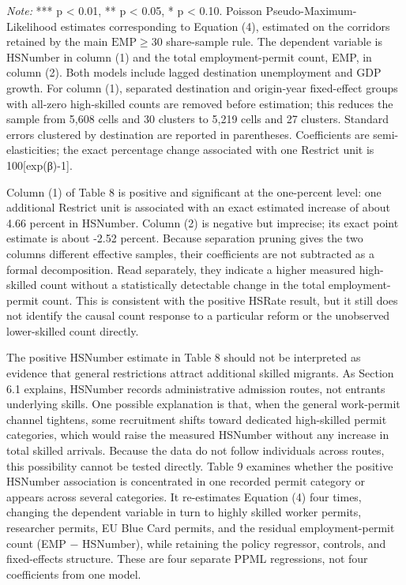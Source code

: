 \documentclass[11pt,a4paper]{article}
\newcommand{\TableNote}[1]{%
  \par\vspace{-0.35em}\noindent
  \begin{minipage}{\linewidth}\footnotesize\setstretch{1.05}\textit{Note:} #1\end{minipage}
  \par\vspace{0.65em}%
}
\begin{document}
\TableNote{*** p \textless{} 0.01, ** p \textless{} 0.05, * p
\textless{} 0.10. Poisson Pseudo-Maximum-Likelihood estimates
corresponding to Equation (4), estimated on the corridors retained by
the main \(\mathrm{EMP}\ge 30\) share-sample rule. The dependent variable
is HSNumber in column (1) and the total employment-permit count, EMP, in
column (2). Both models include lagged destination unemployment and GDP
growth. For column (1), separated destination and origin-year
fixed-effect groups with all-zero high-skilled counts are removed before
estimation; this reduces the sample from 5,608 cells and 30 clusters to
5,219 cells and 27 clusters. Standard errors clustered by destination
are reported in parentheses. Coefficients are semi-elasticities; the
exact percentage change associated with one Restrict unit is
100{[}exp(β)-1{]}.}

Column (1) of Table 8 is positive and significant at the one-percent
level: one additional Restrict unit is associated with an exact
estimated increase of about 4.66 percent in HSNumber. Column (2) is
negative but imprecise; its exact point estimate is about -2.52 percent.
Because separation pruning gives the two columns different effective
samples, their coefficients are not subtracted as a formal
decomposition. Read separately, they indicate a higher measured
high-skilled count without a statistically detectable change in the
total employment-permit count. This is consistent with the positive
HSRate result, but it still does not identify the causal count response
to a particular reform or the unobserved lower-skilled count directly.

The positive HSNumber estimate in Table 8 should not be interpreted as
evidence that general restrictions attract additional skilled migrants.
As Section 6.1 explains, HSNumber records administrative admission
routes, not entrants\textquotesingle{} underlying skills. One possible
explanation is that, when the general work-permit channel tightens, some
recruitment shifts toward dedicated high-skilled permit categories,
which would raise the measured HSNumber without any increase in total
skilled arrivals. Because the data do not follow individuals across
routes, this possibility cannot be tested directly. Table 9 examines
whether the positive HSNumber association is concentrated in one
recorded permit category or appears across several categories. It
re-estimates Equation (4) four times, changing the dependent variable in
turn to highly skilled worker permits, researcher permits, EU Blue Card
permits, and the residual employment-permit count (EMP − HSNumber),
while retaining the policy regressor, controls, and fixed-effects
structure. These are four separate PPML regressions, not four
coefficients from one model.
\end{document}
